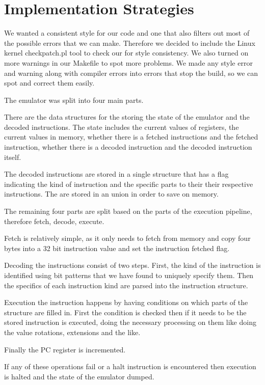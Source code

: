 \documentclass[11pt]{article}
\begin{document}
\section{Implementation Strategies}

We wanted a consistent style for our code and one that also filters out most of
the possible errors that we can make. Therefore we decided to include the Linux
kernel checkpatch.pl tool to check our for style consistency. We also turned on
more warnings in our Makefile to spot more problems. We made any style error and
warning along with compiler errors into errors that stop the build, so we can
spot and correct them easily.

The emulator was split into four main parts.

There are the data structures for the storing the state of the emulator and the
decoded instructions. The state includes the current values of registers, the
current values in memory, whether there is a fetched instructions and the
fetched instruction, whether there is a decoded instruction and the decoded
instruction itself.

The decoded instructions are stored in a single structure that has a flag
indicating the kind of instruction and the specific parts to their their
respective instructions. The are stored in an union in order to save on memory.

The remaining four parts are split based on the parts of the execution pipeline,
therefore fetch, decode, execute.

Fetch is relatively simple, as it only needs to fetch from memory and copy four
bytes into a 32 bit instruction value and set the instruction fetched flag.

Decoding the instructions consist of two steps. First, the kind of the
instruction is identified using bit patterns that we have found to uniquely
specify them. Then the specifics of each instruction kind are parsed into the
instruction structure.

Execution the instruction happens by having conditions on which parts of the
structure are filled in. First the condition is checked then if it needs to be
the stored instruction is executed, doing the necessary processing on them like
doing the value rotations, extensions and the like.

Finally the PC register is incremented.

If any of these operations fail or a halt instruction is encountered then
execution is halted and the state of the emulator dumped.
\end{document}
